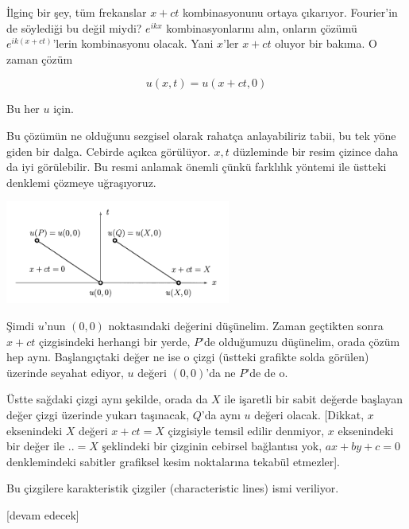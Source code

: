 \documentclass[12pt,fleqn]{article}\usepackage{../../common}
\begin{document}
İlginç bir şey, tüm frekanslar $x+ct$ kombinasyonunu ortaya
çıkarıyor. Fourier'in de söylediği bu değil miydi? $e^{ikx}$ kombinasyonlarını
alın, onların çözümü $e^{ik(x + ct)}$'lerin kombinasyonu olacak. Yani
$x$'ler $x+ct$ oluyor bir bakıma. O zaman çözüm

$$
u(x,t) = u(x+ct, 0)
$$

Bu her $u$ için.

Bu çözümün ne olduğunu sezgisel olarak rahatça anlayabiliriz tabii, bu
tek yöne giden bir dalga. Cebirde açıkca görülüyor. $x,t$ düzleminde
bir resim çizince daha da iyi görülebilir. Bu resmi anlamak önemli
çünkü farklılık yöntemi ile üstteki denklemi çözmeye uğraşıyoruz.

\includegraphics[width=20em]{compscieng_2_03_01.png}

Şimdi $u$'nun $(0,0)$ noktasındaki değerini düşünelim. Zaman geçtikten sonra
$x+ct$ çizgisindeki herhangi bir yerde, $P$'de olduğumuzu düşünelim, orada çözüm
hep aynı. Başlangıçtaki değer ne ise o çizgi (üstteki grafikte solda görülen)
üzerinde seyahat ediyor, $u$ değeri $(0,0)$'da ne $P$'de de o.

Üstte sağdaki çizgi aynı şekilde, orada da $X$ ile işaretli bir sabit değerde
başlayan değer çizgi üzerinde yukarı taşınacak, $Q$'da aynı $u$ değeri olacak.
[Dikkat, $x$ eksenindeki $X$ değeri $x+ct = X$ çizgisiyle temsil edilir
denmiyor, $x$ eksenindeki bir değer ile $.. =X$ şeklindeki bir çizginin
cebirsel bağlantısı yok, $ax+by+c=0$ denklemindeki sabitler grafiksel kesim
noktalarına tekabül etmezler].

Bu çizgilere karakteristik çizgiler (characteristic lines) ismi veriliyor.














[devam edecek]
\end{document}
